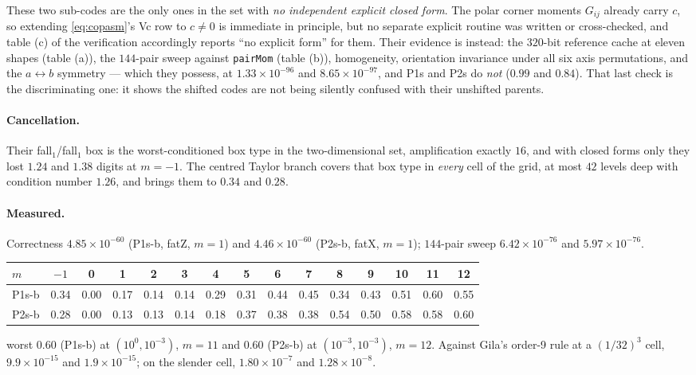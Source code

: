 \documentclass[11pt]{article}
\theoremstyle{remark}
\newcommand{\code}[1]{\texttt{#1}}
\begin{document}
These two sub-codes are the only ones in the set with \emph{no independent explicit closed
form}. The polar corner moments $G_{ij}$ already carry $c$, so extending
\eqref{eq:copasm}'s Vc row to $c\neq 0$ is immediate in principle, but no separate
explicit routine was written or cross-checked, and table (c) of the verification
accordingly reports ``no explicit form'' for them. Their evidence is instead: the
$320$-bit reference cache at eleven shapes (table (a)), the $144$-pair sweep against
\code{pairMom} (table (b)), homogeneity, orientation invariance under all six axis
permutations, and the $a\leftrightarrow b$ symmetry --- which they possess, at
$1.33\times10^{-96}$ and $8.65\times10^{-97}$, and P1s and P2s do \emph{not} ($0.99$ and
$0.84$). That last check is the discriminating one: it shows the shifted codes are not
being silently confused with their unshifted parents.

\paragraph{Cancellation.} Their fall$_1$/fall$_1$ box is the worst-conditioned box type in
the two-dimensional set, amplification exactly $16$, and with closed forms only they lost
$1.24$ and $1.38$ digits at $m = -1$. The centred Taylor branch covers that box type in
\emph{every} cell of the grid, at most $42$ levels deep with condition number $1.26$, and
brings them to $0.34$ and $0.28$.

\paragraph{Measured.} Correctness $4.85\times10^{-60}$ (P1s-b, fatZ, $m=1$) and
$4.46\times10^{-60}$ (P2s-b, fatX, $m=1$); $144$-pair sweep $6.42\times10^{-76}$ and
$5.97\times10^{-76}$.

\begin{center}\small
\begin{tabular}{@{}lcccccccccccccc@{}}
\toprule
$m$ & $-1$ & 0 & 1 & 2 & 3 & 4 & 5 & 6 & 7 & 8 & 9 & 10 & 11 & 12\\
\midrule
P1s-b & 0.34 & 0.00 & 0.17 & 0.14 & 0.14 & 0.29 & 0.31 & 0.44 & 0.45 & 0.34 & 0.43 & 0.51 & 0.60 & 0.55\\
P2s-b & 0.28 & 0.00 & 0.13 & 0.13 & 0.14 & 0.18 & 0.37 & 0.38 & 0.38 & 0.54 & 0.50 & 0.58 & 0.58 & 0.60\\
\bottomrule
\end{tabular}
\end{center}
\noindent
worst $0.60$ (P1s-b) at $(10^{0}, 10^{-3})$, $m = 11$ and $0.60$ (P2s-b) at
$(10^{-3}, 10^{-3})$, $m = 12$. Against Gila's order-9 rule at a $(1/32)^3$ cell,
$9.9\times10^{-15}$ and $1.9\times10^{-15}$; on the slender cell, $1.80\times10^{-7}$ and
$1.28\times10^{-8}$.
\end{document}
